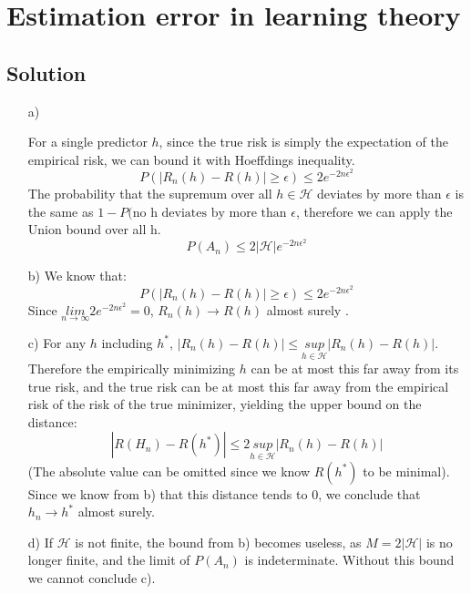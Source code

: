 \documentclass[10pt]{article}
\numberwithin{equation}{section}
\begin{document}
\section*{Estimation error in learning theory}
\subsection*{Solution}

\begin{enumerate}
\item[a)]{
    For a single predictor $h$, since the true risk is simply the expectation of the empirical risk, we can bound it with Hoeffdings inequality.
    $$P(|R_n(h) - R(h)| \geq \epsilon) \leq 2e^{-2n\epsilon^2}$$
    The probability that the supremum over all $h\in \mathcal{H}$ deviates by more than $\epsilon$ is the same as $1-P(\text{no h deviates by more than }\epsilon$, therefore we can apply the Union bound over all h.
    $$P(A_n) \leq 2|\mathcal{H}| e^{-2n\epsilon^2}$$

}
\item[b)]{
    We know that:
    $$P(|R_n(h) - R(h)| \geq \epsilon) \leq 2e^{-2n\epsilon^2}$$
    Since $\underset{n\rightarrow \infty}{lim} 2e^{-2n\epsilon^2} = 0$, $R_n(h) \rightarrow R(h)$ almost surely .
}
\item[c)]{
    For any $h$ including $h^*$, $|R_n(h)-R(h)| \leq \underset{h\in \mathcal{H}}{sup} |R_n(h)-R(h)|$.
    Therefore the empirically minimizing $h$ can be at most this far away from its true risk, and the true risk can be at most this far away from the empirical risk of the risk of the true minimizer, yielding the upper bound on the distance:
    $$|R(H_n) - R(h^*)| \leq 2\underset{h\in \mathcal{H}}{sup} |R_n(h)-R(h)|$$
    (The absolute value can be omitted since we know $R(h^*)$ to be minimal).
    Since we know from b) that this distance tends to 0, we conclude that $h_n \rightarrow h^*$ almost surely.
}
\item[d)]{
    If $\mathcal{H}$ is not finite, the bound from b) becomes useless, as $M=2|\mathcal{H}|$ is no longer finite, and the limit of $P(A_n)$ is indeterminate.
    Without this bound we cannot conclude c).
  }
\end{enumerate}
\end{document}
